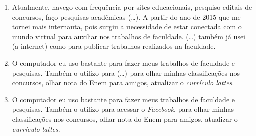 \documentclass{textolivre}
\begin{document}

\begin{enumerate}[resume,label={(\arabic*)},ref={\arabic*},topsep=1ex,partopsep=1ex]
\item\label{exc13} Atualmente, navego com frequência por sites educacionais, pesquiso editais de concursos, faço pesquisas acadêmicas (\ldots). A partir do ano de 2015 que me tornei mais internauta, pois surgiu a necessidade de estar conectada com o mundo virtual para auxiliar nos trabalhos de faculdade. (\ldots) também já usei (a internet) como para publicar trabalhos realizados na faculdade.
\item\label{exc14} O computador eu uso bastante para fazer meus trabalhos de faculdade e pesquisas. Também o utilizo para (\ldots) para olhar minhas classificações nos concursos, olhar nota do Enem para amigos, atualizar o \textit{currículo lattes}.
\item\label{exc15} O computador eu uso bastante para fazer meus trabalhos de faculdade e pesquisas. Também o utilizo para acessar o \textit{Facebook}, para olhar minhas classificações nos concursos, olhar nota do Enem para amigos, atualizar o \textit{currículo lattes}.
\end{enumerate}
\end{document}
